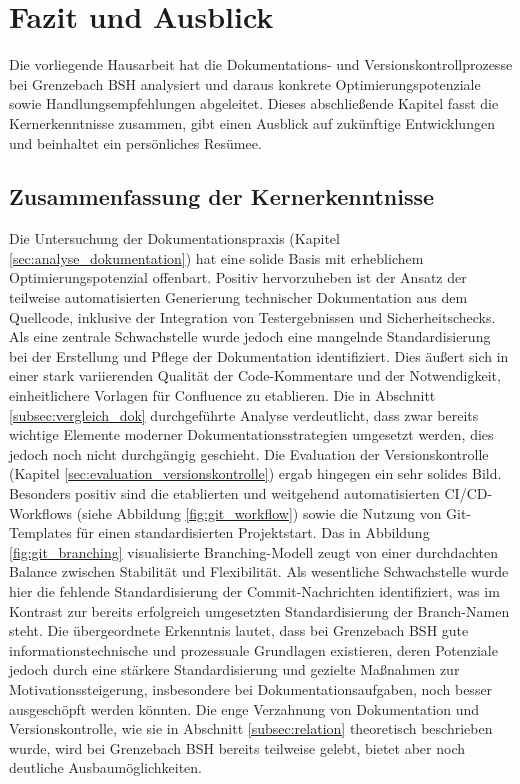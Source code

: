 \documentclass[12pt,oneside]{article}
\begin{document}


    \section{Fazit und Ausblick}
    \label{sec:fazit}
    Die vorliegende Hausarbeit hat die Dokumentations- und Versionskontrollprozesse bei Grenzebach BSH analysiert und daraus konkrete Optimierungspotenziale sowie Handlungsempfehlungen abgeleitet. Dieses abschließende Kapitel fasst die Kernerkenntnisse zusammen, gibt einen Ausblick auf zukünftige Entwicklungen und beinhaltet ein persönliches Resümee.

    \subsection{Zusammenfassung der Kernerkenntnisse}
    \label{subsec:zusammenfassung}
    Die Untersuchung der Dokumentationspraxis (Kapitel \ref{sec:analyse_dokumentation}) hat eine solide Basis mit erheblichem Optimierungspotenzial offenbart. Positiv hervorzuheben ist der Ansatz der teilweise automatisierten Generierung technischer Dokumentation aus dem Quellcode, inklusive der Integration von Testergebnissen und Sicherheitschecks. Als eine zentrale Schwachstelle wurde jedoch eine mangelnde Standardisierung bei der Erstellung und Pflege der Dokumentation identifiziert. Dies äußert sich in einer stark variierenden Qualität der Code-Kommentare und der Notwendigkeit, einheitlichere Vorlagen für Confluence zu etablieren. Die in Abschnitt \ref{subsec:vergleich_dok} durchgeführte Analyse verdeutlicht, dass zwar bereits wichtige Elemente moderner Dokumentationsstrategien umgesetzt werden, dies jedoch noch nicht durchgängig geschieht.
    \newline
    Die Evaluation der Versionskontrolle (Kapitel \ref{sec:evaluation_versionskontrolle}) ergab hingegen ein sehr solides Bild. Besonders positiv sind die etablierten und weitgehend automatisierten CI/CD-Workflows (siehe Abbildung \ref{fig:git_workflow}) sowie die Nutzung von Git-Templates für einen standardisierten Projektstart. Das in Abbildung \ref{fig:git_branching} visualisierte Branching-Modell zeugt von einer durchdachten Balance zwischen Stabilität und Flexibilität. Als wesentliche Schwachstelle wurde hier die fehlende Standardisierung der Commit-Nachrichten identifiziert, was im Kontrast zur bereits erfolgreich umgesetzten Standardisierung der Branch-Namen steht.
    \newline
    Die übergeordnete Erkenntnis lautet, dass bei Grenzebach BSH gute informationstechnische und prozessuale Grundlagen existieren, deren Potenziale jedoch durch eine stärkere Standardisierung und gezielte Maßnahmen zur Motivationssteigerung, insbesondere bei Dokumentationsaufgaben, noch besser ausgeschöpft werden könnten. Die enge Verzahnung von Dokumentation und Versionskontrolle, wie sie in Abschnitt \ref{subsec:relation} theoretisch beschrieben wurde, wird bei Grenzebach BSH bereits teilweise gelebt, bietet aber noch deutliche Ausbaumöglichkeiten.
\end{document}
